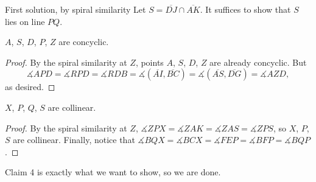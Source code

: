 \begin{customenv}{First solution, by spiral similarity}
    Let $S=\overline{DJ}\cap\overline{AK}$. It suffices to show that $S$ lies on line $PQ$.
    \begin{iclaim}
        $A$, $S$, $D$, $P$, $Z$ are concyclic.
    \end{iclaim}
    \begin{proof}
        By the spiral similarity at $Z$, points $A$, $S$, $D$, $Z$ are already concyclic. But \[\measuredangle APD=\measuredangle RPD=\measuredangle RDB=\measuredangle(\overline{AI},\overline{BC})=\measuredangle(\overline{AS},\overline{DG})=\measuredangle AZD,\]
        as desired.
    \end{proof}
    \begin{iclaim}
        $X$, $P$, $Q$, $S$ are collinear.
    \end{iclaim}
    \begin{proof}
        By the spiral similarity at $Z$, $\measuredangle ZPX=\measuredangle ZAK=\measuredangle ZAS=\measuredangle ZPS$, so $X$, $P$, $S$ are collinear. Finally, notice that $\measuredangle BQX=\measuredangle BCX=\measuredangle FEP=\measuredangle BFP=\measuredangle BQP$.
    \end{proof}

    Claim 4 is exactly what we want to show, so we are done.
\end{customenv}
